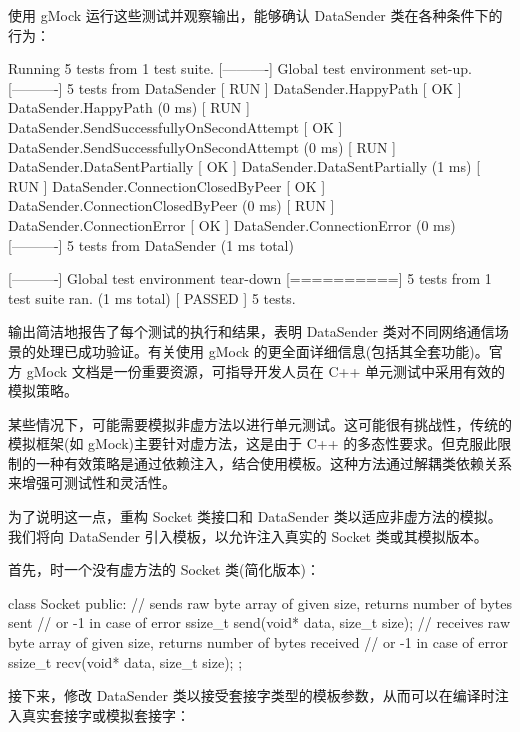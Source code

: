 使用 gMock 运行这些测试并观察输出，能够确认 DataSender 类在各种条件下的行为：

\begin{shell}
[==========] Running 5 tests from 1 test suite.
[----------] Global test environment set-up.
[----------] 5 tests from DataSender
[ RUN      ] DataSender.HappyPath
[       OK ] DataSender.HappyPath (0 ms)
[ RUN      ] DataSender.SendSuccessfullyOnSecondAttempt
[       OK ] DataSender.SendSuccessfullyOnSecondAttempt (0 ms)
[ RUN      ] DataSender.DataSentPartially
[       OK ] DataSender.DataSentPartially (1 ms)
[ RUN      ] DataSender.ConnectionClosedByPeer
[       OK ] DataSender.ConnectionClosedByPeer (0 ms)
[ RUN      ] DataSender.ConnectionError
[       OK ] DataSender.ConnectionError (0 ms)
[----------] 5 tests from DataSender (1 ms total)

[----------] Global test environment tear-down
[==========] 5 tests from 1 test suite ran. (1 ms total)
[ PASSED ] 5 tests.
\end{shell}

输出简洁地报告了每个测试的执行和结果，表明 DataSender 类对不同网络通信场景的处理已成功验证。有关使用 gMock 的更全面详细信息(包括其全套功能)。官方 gMock 文档是一份重要资源，可指导开发人员在 C++ 单元测试中采用有效的模拟策略。


某些情况下，可能需要模拟非虚方法以进行单元测试。这可能很有挑战性，传统的模拟框架(如 gMock)主要针对虚方法，这是由于 C++ 的多态性要求。但克服此限制的一种有效策略是通过依赖注入，结合使用模板。这种方法通过解耦类依赖关系来增强可测试性和灵活性。


为了说明这一点，重构 Socket 类接口和 DataSender 类以适应非虚方法的模拟。我们将向 DataSender 引入模板，以允许注入真实的 Socket 类或其模拟版本。

首先，时一个没有虚方法的 Socket 类(简化版本)：

\begin{cpp}
class Socket {
    public:
    // sends raw byte array of given size, returns number of bytes sent
    // or -1 in case of error
    ssize_t send(void* data, size_t size);
    // receives raw byte array of given size, returns number of bytes received
    // or -1 in case of error
    ssize_t recv(void* data, size_t size);
};
\end{cpp}

接下来，修改 DataSender 类以接受套接字类型的模板参数，从而可以在编译时注入真实套接字或模拟套接字：

